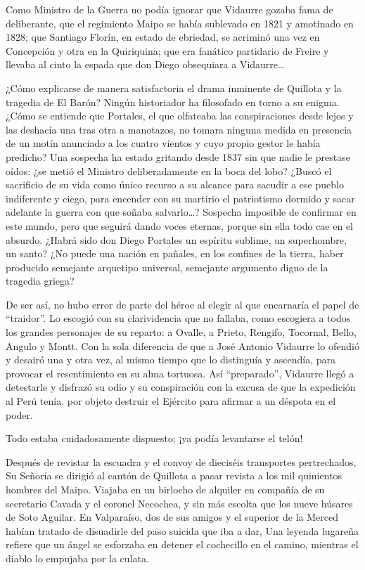\documentclass[10pt,twoside,openright]{memoir}
\begin{document}
Como Ministro de la Guerra no podía ignorar que Vidaurre gozaba fama de
deliberante, que el regimiento Maipo se había sublevado en 1821 y
amotinado en 1828; que Santiago Florín, en estado de ebriedad, se
acriminó una vez en Concepción y otra en la Quiriquina; que era fanático
partidario de Freire y llevaba al cinto la espada que don Diego
obsequiara a Vidaurre\ldots

¿Cómo explicarse de manera satisfactoria el drama inminente de Quillota
y la tragedia de El Barón? Ningún historiador ha filosofado en torno a
su enigma. ¿Cómo se entiende que Portales, el que olfateaba las
conspiraciones desde lejos y las deshacía una tras otra a manotazos, no
tomara ninguna medida en presencia de un motín anunciado a los cuatro
vientos y cuyo propio gestor le había predicho? Una sospecha ha estado
gritando desde 1837 sin que nadie le prestase oídos: ¿se metió el
Ministro deliberadamente en la boca del lobo? ¿Buscó el sacrificio de su
vida como único recurso a su alcance para sacudir a ese pueblo
indiferente y ciego, para encender con su martirio el patriotismo
dormido y sacar adelante la guerra con que soñaba salvarlo\ldots? Sospecha
imposible de confirmar en este mundo, pero que seguirá dando voces
eternas, porque sin ella todo cae en el absurdo. ¿Habrá sido don Diego
Portales un espíritu sublime, un superhombre, un santo? ¿No puede una
nación en pañales, en los confines de la tierra, haber producido
semejante arquetipo universal, semejante argumento digno de la tragedia
griega?

De ser así, no hubo error de parte del héroe al elegir al que encarnaría
el papel de ``traidor''. Lo escogió con su clarividencia que no fallaba,
como escogiera a todos los grandes personajes de su reparto: a Ovalle, a
Prieto, Rengifo, Tocornal, Bello, Angulo y Montt. Con la sola diferencia
de que a José Antonio Vidaurre lo ofendió y desairó una y otra vez, al
mismo tiempo que lo distinguía y ascendía, para provocar el
resentimiento en su alma tortuosa. Así ``preparado'', Vidaurre llegó a
detestarle y disfrazó su odio y su conspiración con la excusa de que la
expedición al Perú tenía. por objeto destruir el Ejército para afirmar a
un déspota en el poder.

Todo estaba cuidadosamente dispuesto; ¡ya podía levantarse el telón!

Después de revistar la escuadra y el convoy de dieciséis transportes
pertrechados, Su Señoría se dirigió al cantón de Quillota a pasar
revista a los mil quinientos hombres del Maipo. Viajaba en un birlocho
de alquiler en compañía de su secretario Cavada y el coronel Necochea, y
sin más escolta que los nueve húsares de Soto Aguilar. En Valparaíso,
dos de sus amigos y el superior de la Merced habían tratado de
disuadirle del paso suicida que iba a dar, Una leyenda lugareña refiere
que un ángel se esforzaba en detener el cochecillo en el camino,
mientras el diablo lo empujaba por la culata.
\end{document}
